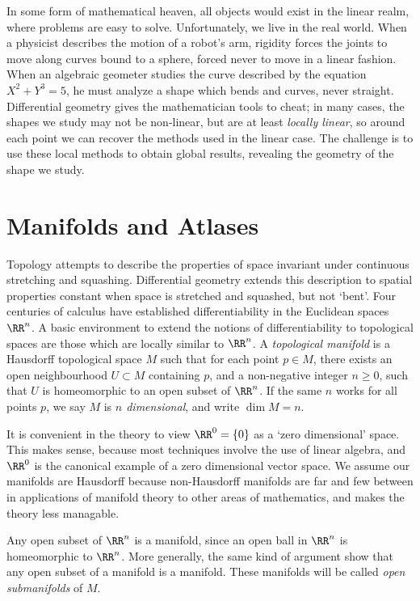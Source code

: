 In some form of mathematical heaven, all objects would exist in the linear realm, where problems are easy to solve. Unfortunately, we live in the real world.  When a physicist describes the motion of a robot's arm, rigidity forces the joints to move along curves bound to a sphere, forced never to move in a linear fashion. When an algebraic geometer studies the curve described by the equation $X^2 + Y^3 = 5$, he must analyze a shape which bends and curves, never straight. Differential geometry gives the mathematician tools to cheat; in many cases, the shapes we study may not be non-linear, but are at least {\it locally linear}, so around each point we can recover the methods used in the linear case. The challenge is to use these local methods to obtain global results, revealing the geometry of the shape we study.

\section{Manifolds and Atlases}

Topology attempts to describe the properties of space invariant under continuous stretching and squashing. Differential geometry extends this description to spatial properties constant when space is stretched and squashed, but not `bent'. Four centuries of calculus have established differentiability in the Euclidean spaces $\RR^n$. A basic environment to extend the notions of differentiability to topological spaces are those which are locally similar to $\RR^n$. A \emph{topological manifold} is a Hausdorff topological space $M$ such that for each point $p \in M$, there exists an open neighbourhood $U \subset M$ containing $p$, and a non-negative integer $n \geq 0$, such that $U$ is homeomorphic to an open subset of $\RR^n$. If the same $n$ works for all points $p$, we say $M$ is \emph{$n$ dimensional}, and write $\dim M = n$.

\begin{remark}
    It is convenient in the theory to view $\RR^0 = \{ 0 \}$ as a `zero dimensional' space. This makes sense, because most techniques involve the use of linear algebra, and $\RR^0$ is the canonical example of a zero dimensional vector space. We assume our manifolds are Hausdorff because non-Hausdorff manifolds are far and few between in applications of manifold theory to other areas of mathematics, and makes the theory less managable.
\end{remark}

\begin{example}
    Any open subset of $\RR^n$ is a manifold, since an open ball in $\RR^n$ is homeomorphic to $\RR^n$. More generally, the same kind of argument show that any open subset of a manifold is a manifold. These manifolds will be called \emph{open submanifolds} of $M$.
\end{example}

